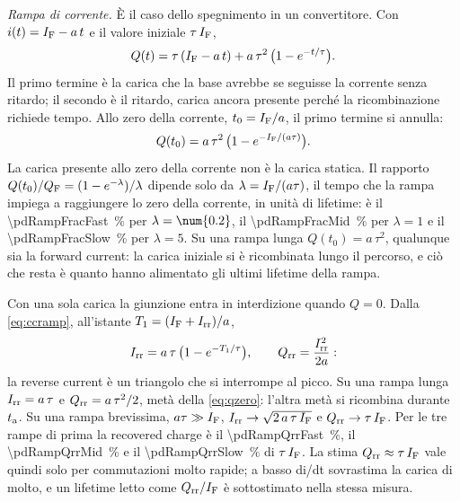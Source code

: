 \documentclass[10pt,a4paper]{scrartcl}
\let\newcommand\pdvaluedefine
\newcommand{\IF}{I_\mathrm{F}}
\newcommand{\Irr}{I_\mathrm{rr}}
\newcommand{\Qrr}{Q_\mathrm{rr}}
\newcommand{\ta}{t_\mathrm{a}}
\newcommand{\Tone}{T_1}
\newcommand{\QF}{Q_\mathrm{F}}
\begin{document}
\emph{Rampa di corrente.} È il caso dello spegnimento in un convertitore. Con $i(t) = \IF - a\,t$ e il valore iniziale $\tau\,\IF$,
\begin{equation}
Q(t) = \tau\,(\IF - a\,t) + a\,\tau^2\,\bigl(1 - e^{-t/\tau}\bigr) .
\label{eq:ccramp}
\end{equation}
Il primo termine è la carica che la base avrebbe se seguisse la corrente senza ritardo; il secondo è il ritardo, carica ancora presente perché la ricombinazione richiede tempo. Allo zero della corrente, $t_0 = \IF/a$, il primo termine si annulla:
\begin{equation}
Q(t_0) = a\,\tau^2\,\bigl(1 - e^{-\IF/(a\tau)}\bigr) .
\label{eq:qzero}
\end{equation}
La carica presente allo zero della corrente non è la carica statica. Il rapporto $Q(t_0)/\QF = (1 - e^{-\lambda})/\lambda$ dipende solo da $\lambda = \IF/(a\tau)$, il tempo che la rampa impiega a raggiungere lo zero della corrente, in unità di lifetime: è il \SI{\pdRampFracFast}{\percent} per $\lambda = \num{\pdRampLamFast}$, il \SI{\pdRampFracMid}{\percent} per $\lambda = 1$ e il \SI{\pdRampFracSlow}{\percent} per $\lambda = 5$. Su una rampa lunga $Q(t_0) = a\,\tau^2$, qualunque sia la forward current: la carica iniziale si è ricombinata lungo il percorso, e ciò che resta è quanto hanno alimentato gli ultimi lifetime della rampa.

Con una sola carica la giunzione entra in interdizione quando $Q = 0$. Dalla \eqref{eq:ccramp}, all'istante $\Tone = (\IF + \Irr)/a$,
\begin{equation}
\Irr = a\,\tau\,\bigl(1 - e^{-\Tone/\tau}\bigr) , \qquad \Qrr = \frac{\Irr^2}{2a} :
\label{eq:ccpeak}
\end{equation}
la reverse current è un triangolo che si interrompe al picco. Su una rampa lunga $\Irr = a\,\tau$ e $\Qrr = a\,\tau^2/2$, metà della \eqref{eq:qzero}: l'altra metà si ricombina durante $\ta$. Su una rampa brevissima, $a\tau \gg \IF$, $\Irr \to \sqrt{2\,a\,\tau\,\IF}$ e $\Qrr \to \tau\,\IF$. Per le tre rampe di prima la recovered charge è il \SI{\pdRampQrrFast}{\percent}, il \SI{\pdRampQrrMid}{\percent} e il \SI{\pdRampQrrSlow}{\percent} di $\tau\,\IF$. La stima $\Qrr \approx \tau\,\IF$ vale quindi solo per commutazioni molto rapide; a basso di/dt sovrastima la carica di molto, e un lifetime letto come $\Qrr/\IF$ è sottostimato nella stessa misura.
\end{document}
